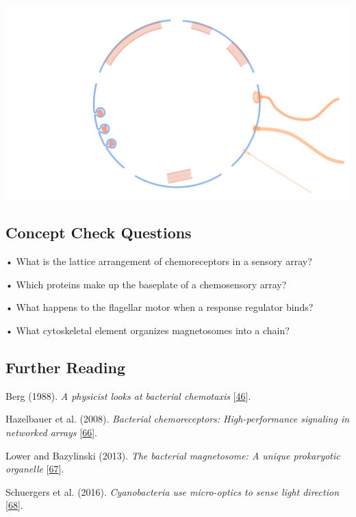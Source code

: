 \documentclass[]{tufte-book}
\begin{document}
\includegraphics{img/summaries/07_Navigation}

\hypertarget{concept-check-questions-6}{%
\subsection*{Concept Check Questions}\label{concept-check-questions-6}}

• What is the lattice arrangement of chemoreceptors in a sensory array?

• Which proteins make up the baseplate of a chemosensory array?

• What happens to the flagellar motor when a response regulator binds?

• What cytoskeletal element organizes magnetosomes into a chain?

\hypertarget{further-reading-6}{%
\subsection*{Further Reading}\label{further-reading-6}}

Berg (1988). \emph{A physicist looks at bacterial chemotaxis} {[}\protect\hyperlink{ref-berg1988}{46}{]}.

Hazelbauer et al. (2008). \emph{Bacterial chemoreceptors: High-performance signaling in networked arrays} {[}\protect\hyperlink{ref-hazelbauer2008}{66}{]}.

Lower and Bazylinski (2013). \emph{The bacterial magnetosome: A unique prokaryotic organelle} {[}\protect\hyperlink{ref-lower2013}{67}{]}.

Schuergers et al. (2016). \emph{Cyanobacteria use micro-optics to sense light direction} {[}\protect\hyperlink{ref-schuergers2016}{68}{]}.
\end{document}
